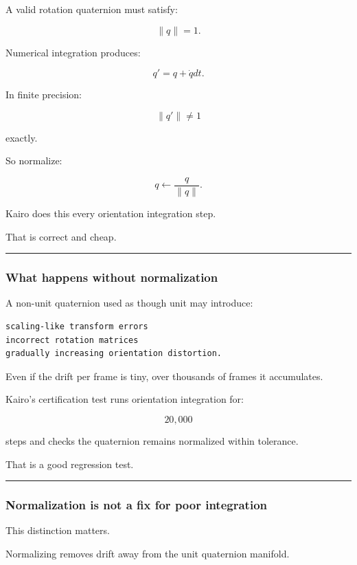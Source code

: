 A valid rotation quaternion must satisfy:

\[
\|q\|=1.
\]

Numerical integration produces:

\[
q'
=
q+\dot qdt.
\]

In finite precision:

\[
\|q'\|
\neq1
\]

exactly.

So normalize:

\[
\boxed{
q
\leftarrow
\frac{q}{\|q\|}.
}
\]

Kairo does this every orientation integration step.

That is correct and cheap.

\begin{center}\rule{0.5\linewidth}{0.5pt}\end{center}

\subsubsection{What happens without normalization}\label{what-happens-without-normalization}

A non-unit quaternion used as though unit may introduce:

\begin{verbatim}
scaling-like transform errors
incorrect rotation matrices
gradually increasing orientation distortion.
\end{verbatim}

Even if the drift per frame is tiny, over thousands of frames it accumulates.

Kairo's certification test runs orientation integration for:

\[
20,000
\]

steps and checks the quaternion remains normalized within tolerance.

That is a good regression test.

\begin{center}\rule{0.5\linewidth}{0.5pt}\end{center}

\subsubsection{Normalization is not a fix for poor integration}\label{normalization-is-not-a-fix-for-poor-integration}

This distinction matters.

Normalizing removes drift away from the unit quaternion manifold.

